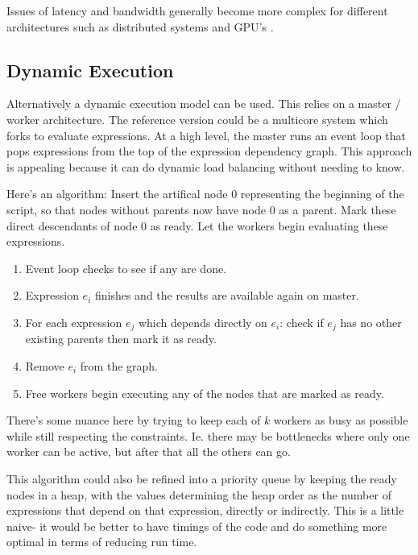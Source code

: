 \documentclass[12pt]{article}
\begin{document}


Issues of latency and bandwidth generally become more complex for different
architectures such as distributed systems and GPU's
\cite{matloff2015parallel}.

\subsection{Dynamic Execution}
\label{sec:dynamic}

Alternatively a dynamic execution model can be used. This relies on a
master / worker architecture. The reference version could be a multicore
system which forks to evaluate expressions.  At a high level, the master
runs an event loop that pops expressions from the top of the expression
dependency graph.
This approach is appealing
because it can do dynamic load balancing without needing to know.

Here's an algorithm: Insert the artifical node 0 representing the beginning
of the script, so that nodes without parents now have node 0 as a parent. Mark
these direct descendants of node 0 as ready. Let the workers begin evaluating
these expressions.

\begin{enumerate}
    \item Event loop checks to see if any are done.
    \item Expression $e_i$ finishes and the results are available again
        on master.
    \item For each expression $e_j$ which depends directly on $e_i$: check
        if $e_j$ has no other existing parents then mark it as ready.
    \item Remove $e_i$ from the graph.
    \item Free workers begin executing any of the nodes that are marked as ready.
\end{enumerate}

There's some nuance here by trying to keep each of $k$ workers as busy as
possible while still respecting the constraints. Ie. there may be
bottlenecks where only one worker can be active, but after that all the
others can go.

This algorithm could also be refined into a priority queue by keeping the ready
nodes in a heap, with the values determining the heap order as the number
of expressions that depend on that expression, directly or indirectly. This
is a little naive- it would be better to have timings of the code and do
something more optimal in terms of reducing run time.
\end{document}
